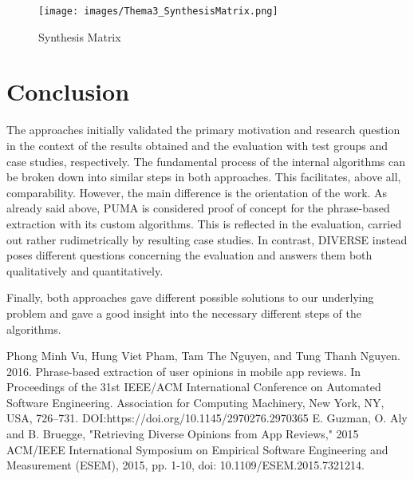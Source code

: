 \begin{figure}
\centering
\texttt{[image: images/Thema3\_SynthesisMatrix.png]}
\caption{Synthesis Matrix}
\label{fig:synthesisMatrix}
\end{figure}

\chapter{Conclusion}
\label{chap:6}

The approaches initially validated the primary motivation and research question in the context of the results obtained and the evaluation with test groups and case studies, respectively. The fundamental process of the internal algorithms can be broken down into similar steps in both approaches. This facilitates, above all, comparability. However, the main difference is the orientation of the work. As already said above, PUMA is considered proof of concept for the phrase-based extraction with its custom algorithms. This is reflected in the evaluation, carried out rather rudimetrically by resulting case studies. In contrast, DIVERSE instead poses different questions concerning the evaluation and answers them both qualitatively and quantitatively.

Finally, both approaches gave different possible solutions to our underlying problem and gave a good insight into the necessary different steps of the algorithms.



\begin{thebibliography}{9}
 Phong Minh Vu, Hung Viet Pham, Tam The Nguyen, and Tung Thanh Nguyen. 2016. Phrase-based extraction of user opinions in mobile app reviews. In Proceedings of the 31st IEEE/ACM International Conference on Automated Software Engineering. Association for Computing Machinery, New York, NY, USA, 726–731. DOI:https://doi.org/10.1145/2970276.2970365
 E. Guzman, O. Aly and B. Bruegge, "Retrieving Diverse Opinions from App Reviews," 2015 ACM/IEEE International Symposium on Empirical Software Engineering and Measurement (ESEM), 2015, pp. 1-10, doi: 10.1109/ESEM.2015.7321214.
\end{thebibliography}